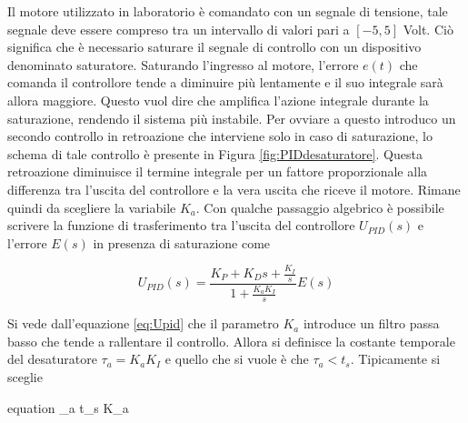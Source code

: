 		\noindent Il motore utilizzato in laboratorio è comandato con un segnale di tensione, tale segnale deve essere compreso tra un intervallo di valori pari a $[-5,5]$ Volt. Ciò significa che è necessario saturare il segnale di controllo con un dispositivo denominato saturatore. Saturando l'ingresso al motore, l'errore $e(t)$ che comanda il controllore tende a diminuire più lentamente e il suo integrale sarà allora maggiore. Questo vuol dire che amplifica l'azione integrale durante la saturazione, rendendo il sistema più instabile. Per ovviare a questo introduco un secondo controllo in retroazione che interviene solo in caso di saturazione, lo schema di tale controllo è presente in Figura \ref{fig:PIDdesaturatore}. Questa retroazione diminuisce il termine integrale per un fattore proporzionale alla differenza tra l'uscita del controllore e la vera uscita che riceve il motore. Rimane quindi da scegliere la variabile $K_a$. Con qualche passaggio algebrico è possibile scrivere la funzione di trasferimento tra l'uscita del controllore $U_{PID}(s)$ e l'errore $E(s)$ in presenza di saturazione come   
	
		\begin{equation}
			U_{PID}(s)=\frac{K_P+K_Ds+\frac{K_I}{s}}{1+\frac{K_aK_I}{s}}E(s)
			\label{eq:Upid}
		\end{equation}
	
		\noindent Si vede dall'equazione \ref{eq:Upid} che il parametro $K_a$ introduce un filtro passa basso che tende a rallentare il controllo. Allora si definisce la costante temporale del desaturatore $\tau_a=K_aK_I$ e quello che si vuole è che $\tau_a<t_s$. Tipicamente si sceglie
		
		\begin{empheq}[box=%
		\fbox]{equation}
			\tau_a \approx {}t_s \trippleSpacing \Rightarrow \trippleSpacing K_a \approx {}
		\end{empheq}